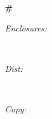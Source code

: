 \documentclass[11pt]{article}
\begin{document}
\begin{center}
\textbf{\#}
\end{center}

\begin{flushleft}
\begin{minipage}{0.4\textwidth}
\hspace*{-4cm}\large
\emph{Enclosures:} 
\end{minipage}\\[0.25cm]
\begin{minipage}{0.4\textwidth}
\hspace*{-4cm}\large
\emph{Dist:} 
\end{minipage}\\[0.25cm]
\begin{minipage}{0.4\textwidth}
\hspace*{-4cm}\large
\emph{Copy:} 
\end{minipage}\\[0.25cm]
\end{flushleft}
\end{document}
